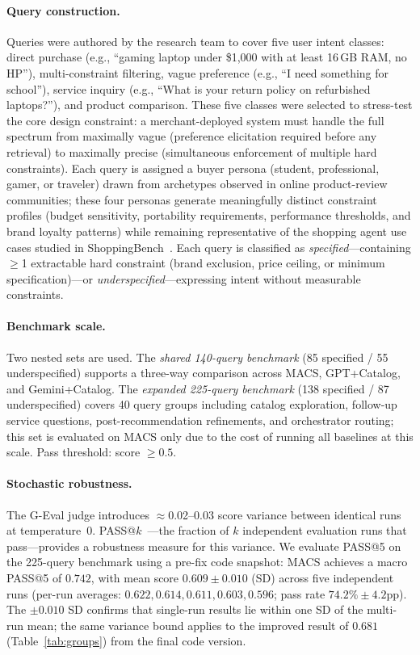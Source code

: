 \documentclass[sigconf,anonymous]{acmart}
\newcommand{\GPTCatalog}{GPT\allowbreak{}+\allowbreak{}Catalog}
\newcommand{\GeminiCatalog}{Gemini\allowbreak{}+\allowbreak{}Catalog}
\begin{document}
\paragraph{Query construction.}
Queries were authored by the research team to cover five user intent classes:
direct purchase (e.g., ``gaming laptop under \$1{,}000 with at least 16\,GB RAM,
no HP''), multi-constraint filtering, vague preference (e.g., ``I need something
for school''), service inquiry (e.g., ``What is your return policy on
refurbished laptops?''), and product comparison.
These five classes were selected to stress-test the core design constraint:
a merchant-deployed system must handle the full spectrum from maximally vague
(preference elicitation required before any retrieval) to maximally precise
(simultaneous enforcement of multiple hard constraints).
Each query is assigned a buyer persona (student, professional, gamer, or
traveler) drawn from archetypes observed in online product-review communities;
these four personas generate meaningfully distinct constraint profiles
(budget sensitivity, portability requirements, performance thresholds, and
brand loyalty patterns) while remaining representative of the shopping agent
use cases studied in ShoppingBench~\cite{Wang2025ShoppingBench}.
Each query is classified as \emph{specified}---containing $\geq$1 extractable
hard constraint (brand exclusion, price ceiling, or minimum specification)---or
\emph{underspecified}---expressing intent without measurable constraints.

\paragraph{Benchmark scale.}
Two nested sets are used.
The \emph{shared 140-query benchmark} (85 specified / 55 underspecified) supports
a three-way comparison across MACS, \GPTCatalog{}, and \GeminiCatalog{}.
The \emph{expanded 225-query benchmark} (138 specified / 87 underspecified)
covers 40 query groups including catalog exploration, follow-up service questions,
post-recommendation refinements, and orchestrator routing; this set is evaluated
on MACS only due to the cost of running all baselines at this scale.
Pass threshold: score $\geq 0.5$.

\paragraph{Stochastic robustness.}
The G-Eval judge introduces $\approx$0.02--0.03 score variance between
identical runs at temperature~0.
PASS@$k$~\cite{Chen2021Codex}---the fraction of $k$ independent evaluation
runs that pass---provides a robustness measure for this variance.
We evaluate PASS@5 on the 225-query benchmark using a pre-fix code snapshot:
MACS achieves a macro PASS@5 of $0.742$, with mean score $0.609 \pm 0.010$ (SD)
across five independent runs (per-run averages: $0.622, 0.614, 0.611, 0.603, 0.596$;
pass rate $74.2\% \pm 4.2$pp). The $\pm 0.010$ SD confirms that single-run
results lie within one SD of the multi-run mean; the same variance bound applies
to the improved result of $0.681$ (Table~\ref{tab:groups}) from the final code
version.
\end{document}
